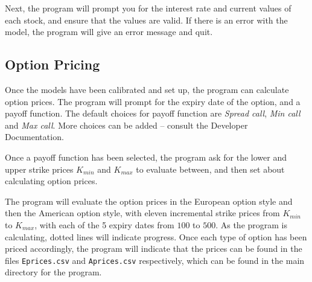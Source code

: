 \documentclass[12pt,a4paper]{article}
\begin{document}
Next, the program will prompt you for the interest rate and current values of 
each stock, and ensure that the values are valid. If there is an error with the 
model, the program will give an error message and quit.


\subsection{Option Pricing}
Once the models have been calibrated and set up, the program can calculate 
option prices. The program will prompt for the expiry date of the option, and a 
payoff function. The default choices for payoff function are \textit{Spread 
call}, \textit{Min call} and \textit{Max call}. More choices can be added -- 
consult the Developer Documentation.

Once a payoff function has been selected, the program ask for the lower and 
upper strike prices $K_{min}$ and $K_{max}$ to evaluate between, and then set 
about calculating option prices.

The program will evaluate the option prices in the European option style and 
then the American option style, with eleven incremental strike prices from 
$K_{min}$ to $K_{max}$, with each of the 5 expiry dates from $100$ to $500$. As 
the program is calculating, dotted lines will indicate progress. Once each type 
of option has been  priced accordingly, the program will indicate that the 
prices can be found in the files \texttt{Eprices.csv} and \texttt{Aprices.csv} 
respectively, which can be found in the main directory for the program.
\end{document}
